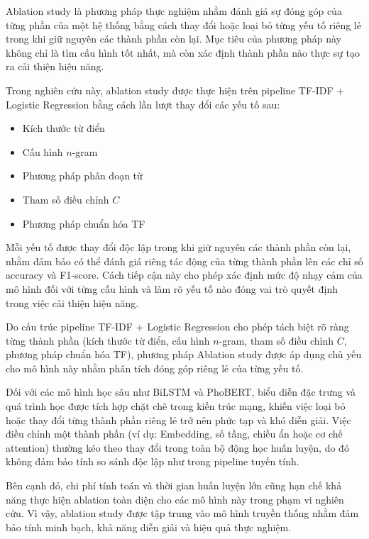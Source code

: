 Ablation study là phương pháp thực nghiệm nhằm đánh giá sự đóng góp của từng phần của một hệ thống bằng cách thay đổi hoặc loại bỏ từng yếu tố riêng lẻ trong khi giữ nguyên các thành phần còn lại. Mục tiêu của phương pháp này không chỉ là tìm cấu hình tốt nhất, mà còn xác định thành phần nào thực sự tạo ra cải thiện hiệu năng.

Trong nghiên cứu này, ablation study được thực hiện trên pipeline TF-IDF + Logistic Regression bằng cách lần lượt thay đổi các yếu tố sau:

\begin{itemize}
    \item Kích thước từ điển
    \item Cấu hình $n$-gram
    \item Phương pháp phân đoạn từ
    \item Tham số điều chỉnh $C$
    \item Phương pháp chuẩn hóa TF
\end{itemize}

Mỗi yếu tố được thay đổi độc lập trong khi giữ nguyên các thành phần còn lại, nhằm đảm bảo có thể đánh giá riêng tác động của từng thành phần lên các chỉ số accuracy và F1-score. Cách tiếp cận này cho phép xác định mức độ nhạy cảm của mô hình đối với từng cấu hình và làm rõ yếu tố nào đóng vai trò quyết định trong việc cải thiện hiệu năng.

Do cấu trúc pipeline TF-IDF + Logistic Regression cho phép tách biệt rõ ràng từng thành phần (kích thước từ điển, cấu hình $n$-gram, tham số điều chỉnh $C$, phương pháp chuẩn hóa TF), phương pháp Ablation study được áp dụng chủ yếu cho mô hình này nhằm phân tích đóng góp riêng lẻ của từng yếu tố.

Đối với các mô hình học sâu như BiLSTM và PhoBERT, biểu diễn đặc trưng và quá trình học được tích hợp chặt chẽ trong kiến trúc mạng, khiến việc loại bỏ hoặc thay đổi từng thành phần riêng lẻ trở nên phức tạp và khó diễn giải. Việc điều chỉnh một thành phần (ví dụ: Embedding, số tầng, chiều ẩn hoặc cơ chế attention) thường kéo theo thay đổi trong toàn bộ động học huấn luyện, do đó không đảm bảo tính so sánh độc lập như trong pipeline tuyến tính.

Bên cạnh đó, chi phí tính toán và thời gian huấn luyện lớn cũng hạn chế khả năng thực hiện ablation toàn diện cho các mô hình này trong phạm vi nghiên cứu. Vì vậy, ablation study được tập trung vào mô hình truyền thống nhằm đảm bảo tính minh bạch, khả năng diễn giải và hiệu quả thực nghiệm.


